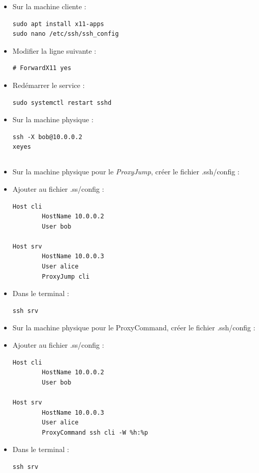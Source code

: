 \documentclass{article}
\begin{document}
\begin{itemize}
\item Sur la machine cliente :
\begin{lstlisting}
sudo apt install x11-apps
sudo nano /etc/ssh/ssh_config
\end{lstlisting}
\item Modifier la ligne suivante :
\begin{lstlisting}
# ForwardX11 yes
\end{lstlisting}
\item Redémarrer le service :
\begin{lstlisting}
sudo systemctl restart sshd
\end{lstlisting}
\item Sur la machine physique :
\begin{lstlisting}
ssh -X bob@10.0.0.2
xeyes
\end{lstlisting}
\end{itemize}

\subsection{}

\begin{itemize}
\item Sur la machine physique pour le \emph{ProxyJump}, créer le fichier .ssh/config :
\item Ajouter au fichier .ss/config :
\begin{lstlisting}
Host cli
        HostName 10.0.0.2
        User bob

Host srv
        HostName 10.0.0.3
        User alice
        ProxyJump cli
\end{lstlisting}
\item Dans le terminal :
\begin{lstlisting}
ssh srv
\end{lstlisting}
\item Sur la machine physique pour le ProxyCommand, créer le fichier .ssh/config :
\item Ajouter au fichier .ss/config :
\begin{lstlisting}
Host cli
        HostName 10.0.0.2
        User bob

Host srv
        HostName 10.0.0.3
        User alice
        ProxyCommand ssh cli -W %h:%p
\end{lstlisting}
\item Dans le terminal :
\begin{lstlisting}
ssh srv
\end{lstlisting}
\end{itemize}
\end{document}
